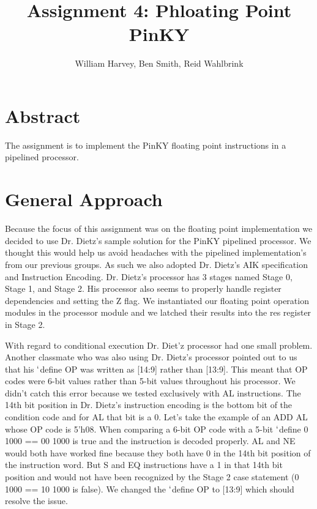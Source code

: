 \documentclass{article}
\begin{document}
\title{Assignment 4: Phloating Point PinKY}

\author{William Harvey, Ben Smith, Reid Wahlbrink}


\maketitle
\thispagestyle{empty}

\begin{multicols}{2}
\section{Abstract}
The assignment is to implement the PinKY floating point instructions in a pipelined processor.


\section{General Approach}
Because the focus of this assignment was on the floating point implementation we decided to use Dr. Dietz's sample solution for the PinKY pipelined processor. We thought this would help us avoid headaches with the pipelined implementation's from our previous groups. As such we also adopted Dr. Dietz's AIK specification and Instruction Encoding. Dr. Dietz's processor has 3 stages named Stage 0, Stage 1, and Stage 2. His processor also seems to properly handle register dependencies and setting the Z flag. We instantiated our floating point operation modules in the processor module and we latched their results into the res register in Stage 2. 

With regard to conditional execution Dr. Diet'z processor had one small problem. Another classmate who was also using Dr. Dietz's processor pointed out to us that his $`$define OP was written as [14:9] rather than [13:9]. This meant that OP codes were 6-bit values rather than 5-bit values throughout his processor. We didn't catch this error because we tested exclusively with AL instructions. The 14th bit position in Dr. Dietz's instruction encoding is the bottom bit of the condition code and for AL that bit is a 0. Let's take the example of an ADD AL whose OP code is 5'h08. When comparing a 6-bit OP code with a 5-bit $`$define 0 1000 == 00 1000 is true and the instruction is decoded properly. AL and NE would both have worked fine because they both have 0 in the 14th bit position of the instruction word. But S and EQ instructions have a 1 in that 14th bit position and would not have been recognized by the Stage 2 case statement (0 1000 == 10 1000 is false). We changed the $`$define OP to [13:9] which should resolve the issue.


\end{multicols}
\end{document}
